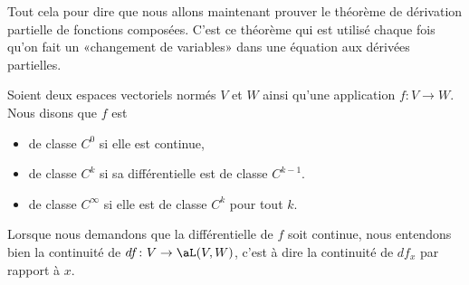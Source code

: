 \begin{normaltext}
    Tout cela pour dire que nous allons maintenant prouver le théorème de dérivation partielle de fonctions composées. C'est ce théorème qui est utilisé chaque fois qu'on fait un «changement de variables» dans une équation aux dérivées partielles.
\end{normaltext}

\begin{definition}  \label{DefPNjMGqy}
    Soient deux espaces vectoriels normés \( V\) et \( W\) ainsi qu'une application \( f\colon V\to W\). Nous disons que \( f\) est 
    \begin{itemize}
        \item de classe  \( C^0\) si elle est continue,
        \item de classe \( C^k\) si sa différentielle est de classe \( C^{k-1}\).
        \item de classe \( C^{\infty}\) si elle est de classe \( C^k\) pour tout \( k\).
    \end{itemize}
\end{definition}

\begin{remark}
    Lorsque nous demandons que la différentielle de \( f\) soit continue, nous entendons bien la continuité de \( df\colon V\to \aL(V,W)\), c'est à dire la continuité de \( df_x\) par rapport à \( x\).
\end{remark}


